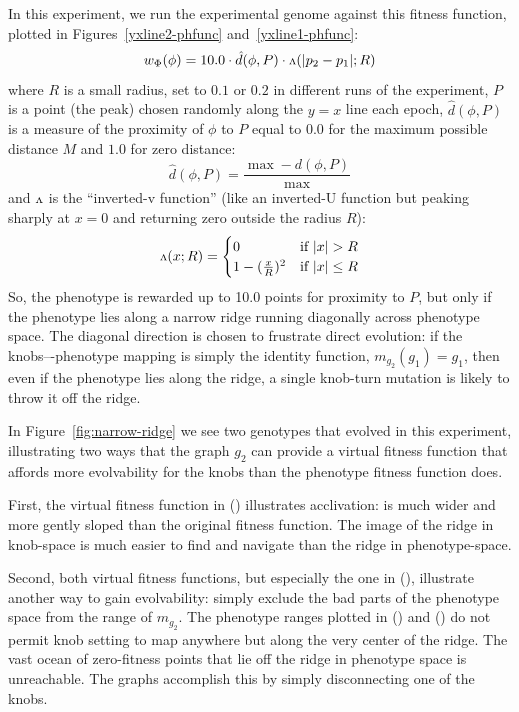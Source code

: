 \documentclass[letterpaper]{article}
\newcommand{\invv}{\ensuremath{\rotatebox[origin=c]{180}{\textrm{v}}}\xspace}
\begin{document}
In this experiment, we run the experimental genome against this fitness
function, plotted in Figures~\ref{yxline2-phfunc} and~\ref{yxline1-phfunc}:
\[
   w_\Phi(\phi) = 10.0 \cdot \hat{d}(\phi, P) \cdot \invv(|p_2 - p_1|; R)
\]
where
$R$ is a small radius, set to $0.1$ or $0.2$ in different runs of the
experiment,
$P$ is a point (the peak) chosen randomly along the $y=x$ line each epoch,
$\hat{d}(\phi, P)$ is a measure of the proximity of $\phi$ to $P$ equal to
$0.0$ for the maximum possible distance $M$ and $1.0$ for zero distance:
\[
  \hat{d}(\phi, P) = \frac{\max - d(\phi, P)}{\max}
\]
and \invv is the ``inverted-v function'' (like an inverted-U function but
peaking sharply at $x=0$ and returning zero outside the radius $R$):
\[
   \invv(x; R) =
   \begin{cases}
      0 & \text{if } |x|>R \\
      1 - (\frac{x}{R})^2 &
      \text{if } |x|\leq R
   \end{cases}
\]
So, the phenotype is rewarded up to 10.0 points for proximity to $P$, but only
if the phenotype lies along a narrow ridge running diagonally across phenotype
space. The diagonal direction is chosen to frustrate direct evolution: if the
knobs–-phenotype mapping is simply the identity function, $m_{g_2}(g_1)=g_1$,
then even if the phenotype lies along the ridge, a single knob-turn mutation
is likely to throw it off the ridge.

In Figure~\ref{fig:narrow-ridge} we see two genotypes that evolved in this
experiment, illustrating two ways that the graph $g_2$ can provide a virtual
fitness function that affords more evolvability for the knobs than the
phenotype fitness function does.

First, the virtual fitness function in () illustrates
acclivation: is much wider and more gently sloped than the original fitness
function. The image of the ridge in knob-space is much easier to find and
navigate than the ridge in phenotype-space.

Second, both virtual fitness functions, but especially the one in
(), illustrate another way to gain evolvability:
simply exclude the bad parts of the phenotype space from the range of
$m_{g_2}$. The phenotype ranges plotted in ()
and ()
do not permit  knob setting to map anywhere but along the very
center of the ridge. The vast ocean of zero-fitness points that lie off the
ridge in phenotype space is unreachable. The graphs accomplish this by simply
disconnecting one of the knobs.
\end{document}
